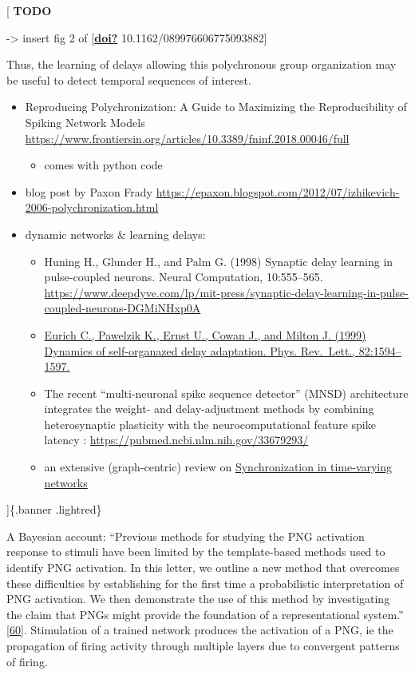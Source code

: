 {[}
\textbf{TODO}

-\textgreater{} insert fig 2 of {[}\protect\hyperlink{ref-doi}{\textbf{doi?}} 10.1162/089976606775093882{]}

Thus, the learning of delays allowing this polychronous group organization may be useful to detect temporal sequences of interest.

\begin{itemize}
\item
  Reproducing Polychronization: A Guide to Maximizing the Reproducibility of Spiking Network Models \url{https://www.frontiersin.org/articles/10.3389/fninf.2018.00046/full}

  \begin{itemize}
  \tightlist
  \item
    comes with python code
  \end{itemize}
\item
  blog post by Paxon Frady \url{https://epaxon.blogspot.com/2012/07/izhikevich-2006-polychronization.html}
\item
  dynamic networks \& learning delays:

  \begin{itemize}
  \item
    Huning H., Glunder H., and Palm G. (1998) Synaptic delay learning in pulse-coupled neurons. Neural Computation, 10:555--565. \url{https://www.deepdyve.com/lp/mit-press/synaptic-delay-learning-in-pulse-coupled-neurons-DGMiNHxp0A}
  \item
    \href{https://www.researchgate.net/publication/37921636_Dynamics_of_Self-Organized_Delay_Adaptation}{Eurich C., Pawelzik K., Ernst U., Cowan J., and Milton J. (1999) Dynamics of self-organazed delay adaptation. Phys. Rev.~Lett., 82:1594--1597.}
  \item
    The recent ``multi-neuronal spike sequence detector'' (MNSD) architecture integrates the weight- and delay-adjustment methods by combining heterosynaptic plasticity with the neurocomputational feature spike latency : \url{https://pubmed.ncbi.nlm.nih.gov/33679293/}
  \item
    an extensive (graph-centric) review on \href{https://arxiv.org/abs/2109.07618}{Synchronization in time-varying networks}
  \end{itemize}
\end{itemize}

{]}\{.banner .lightred\}

A Bayesian account: ``Previous methods for studying the PNG activation response to stimuli have been limited by the template-based methods used to identify PNG activation. In this letter, we outline a new method that overcomes these difficulties by establishing for the first time a probabilistic interpretation of PNG activation. We then demonstrate the use of this method by investigating the claim that PNGs might provide the foundation of a representational system.'' {[}\protect\hyperlink{ref-KS4oxnst}{60}{]}. Stimulation of a trained network produces the activation of a PNG, ie the propagation of firing activity through multiple layers due to convergent patterns of firing.

